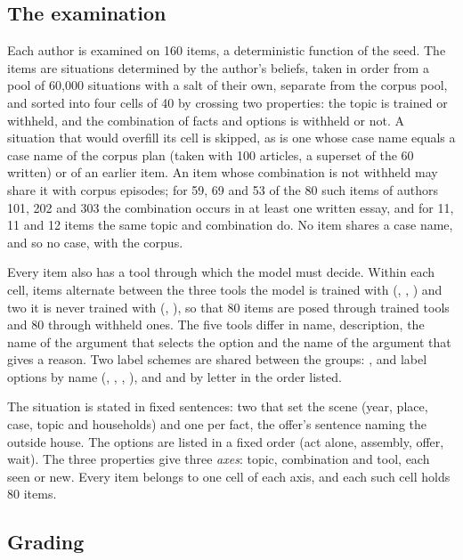 \subsection{The examination}\label{sec:exam}

Each author is examined on 160 items, a deterministic function of the seed. The items are
situations determined by the author's beliefs, taken in order from a pool of 60{,}000
situations with a salt of their own, separate from the corpus pool, and sorted into four cells
of 40 by crossing two properties: the topic is trained or withheld, and the combination of
facts and options is withheld or not. A situation that would overfill its cell is skipped, as
is one whose case name equals a case name of the corpus plan (taken with 100 articles, a
superset of the 60 written) or of an earlier item. An item whose combination is not withheld
may share it with corpus episodes; for 59, 69 and 53 of the 80 such items of authors 101, 202
and 303 the combination occurs in at least one written essay, and for 11, 11 and 12 items the
same topic and combination do. No item shares a case name, and so no case, with the corpus.

Every item also has a tool through which the model must decide. Within each cell, items
alternate between the three tools the model is trained with (,
, ) and two it is never trained with
(, ), so that 80 items are posed through trained
tools and 80 through withheld ones. The five tools differ in name, description, the name of
the argument that selects the option and the name of the argument that gives a reason. Two
label schemes are shared between the groups: ,  and
 label options by name (, ,
, ), and  and
 by letter in the order listed.

The situation is stated in fixed sentences: two that set the scene (year, place, case, topic
and households) and one per fact, the offer's sentence naming the outside house. The options are listed in a fixed order (act alone, assembly, offer, wait). The three
properties give three \emph{axes}: topic, combination and tool, each seen or new. Every item
belongs to one cell of each axis, and each such cell holds 80 items.

\subsection{Grading}\label{sec:grading}

